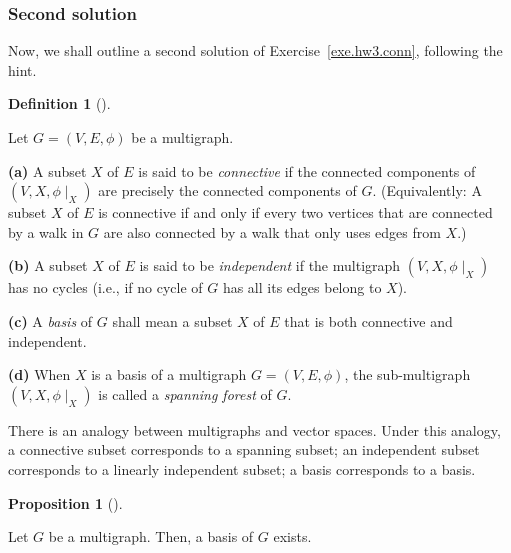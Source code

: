 \documentclass[numbers=enddot,12pt,final,onecolumn,notitlepage]{scrartcl}%
\theoremstyle{definition}
\newtheorem{prop}[theo]{Proposition}
\newenvironment{proposition}[1][]
{\begin{prop}[#1]\begin{leftbar}}
{\end{leftbar}\end{prop}}
\newtheorem{defi}[theo]{Definition}
\newenvironment{definition}[1][]
{\begin{defi}[#1]\begin{leftbar}}
{\end{leftbar}\end{defi}}
\newcommand{\tup}[1]{\left( #1 \right)}
\begin{document}
\subsubsection{Second solution}

Now, we shall outline a second solution of
Exercise~\ref{exe.hw3.conn}, following the hint.

\begin{definition}
Let $G = \tup{V, E, \phi}$ be a multigraph.

\textbf{(a)} A subset $X$ of $E$ is said to be
\textit{connective} if the connected components of
$\tup{V, X, \phi\mid_X}$ are precisely the connected components
of $G$.
(Equivalently:
A subset $X$ of $E$ is connective if and only if every
two vertices that are connected by a walk in $G$ are
also connected by a walk that only uses edges from $X$.)

\textbf{(b)} A subset $X$ of $E$ is said to be
\textit{independent} if
the multigraph $\tup{V, X, \phi\mid_X}$ has no cycles
(i.e., if no cycle of $G$ has all its edges belong to $X$).

\textbf{(c)} A \textit{basis} of $G$ shall mean a subset $X$ of
$E$ that is both connective and independent. 

\textbf{(d)} When $X$ is a basis of a multigraph
$G = \tup{V, E, \phi}$, the
sub-multigraph $\tup{V, X, \phi\mid_X}$ is called a
\textit{spanning forest} of $G$.
\end{definition}

There is an analogy between multigraphs and vector spaces.
Under this analogy, a connective subset corresponds to a
spanning subset; an independent subset corresponds to a
linearly independent subset; a basis corresponds to a basis.

\begin{proposition} \label{prop.hw3.conn.basis1}
Let $G$ be a multigraph. Then, a basis of $G$ exists.
\end{proposition}
\end{document}
